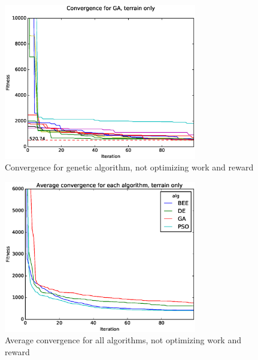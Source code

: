 \documentclass{tamuccthesis}
\begin{document}
\begin{figure}
    \captionsetup{justification=centering}
    \centering
        \includegraphics[width=0.75\textwidth,trim={0cm 0.75cm 0cm 0.75cm},clip]{conv_GA_a.eps}
    \caption{Convergence for genetic algorithm, not optimizing work and reward}
    \label{fig:convergence_a_SGA}
\end{figure}

\begin{figure}
    \captionsetup{justification=centering}
    \centering
        \includegraphics[width=0.75\textwidth,trim={0cm 0.75cm 0cm 0.75cm},clip]{conv_avg_a.eps}
    \caption{Average convergence for all algorithms, not optimizing work and reward}
    \label{fig:convergence_a_avg}
\end{figure}
\end{document}
